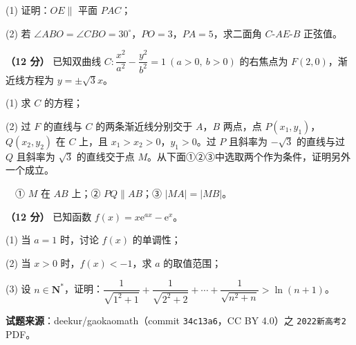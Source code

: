 \begin{center}\end{center}

  (1) 证明：$OE\parallel$ 平面 $PAC$；

  (2) 若 $\angle ABO=\angle CBO=30^\circ$，$PO=3$，$PA=5$，求二面角 $C\text{-}AE\text{-}B$ 正弦值。

\textbf{（12 分）} 已知双曲线 $C:\dfrac{x^{2}}{a^{2}}-\dfrac{y^{2}}{b^{2}}=1\ (a>0,\ b>0)$ 的右焦点为 $F(2,0)$，渐近线方程为 $y=\pm\sqrt3x$。

  (1) 求 $C$ 的方程；

  (2) 过 $F$ 的直线与 $C$ 的两条渐近线分别交于 $A$，$B$ 两点，点 $P\left(x_1,y_1\right)$，$Q\left(x_2,y_2\right)$ 在 $C$ 上，且 $x_1>x_2>0$，$y_1>0$。过 $P$ 且斜率为 $-\sqrt3$ 的直线与过 $Q$ 且斜率为 $\sqrt3$ 的直线交于点 $M$。从下面①②③中选取两个作为条件，证明另外一个成立。

  　① $M$ 在 $AB$ 上；② $PQ\parallel AB$；③ $|MA|=|MB|$。

\textbf{（12 分）} 已知函数 $f(x)=x\mathrm e^{ax}-\mathrm e^{x}$。

  (1) 当 $a=1$ 时，讨论 $f(x)$ 的单调性；

  (2) 当 $x>0$ 时，$f(x)<-1$，求 $a$ 的取值范围；

  (3) 设 $n\in\mathbf N^{*}$，证明：$\dfrac1{\sqrt{1^{2}+1}}+\dfrac1{\sqrt{2^{2}+2}}+\cdots+\dfrac1{\sqrt{n^{2}+n}}>\ln(n+1)$。

\par\medskip

\begin{gktip}
\textbf{试题来源}：deekur/gaokaomath（commit \texttt{34c13a6}，CC BY 4.0）之 \texttt{2022新高考2} PDF。
\end{gktip}

